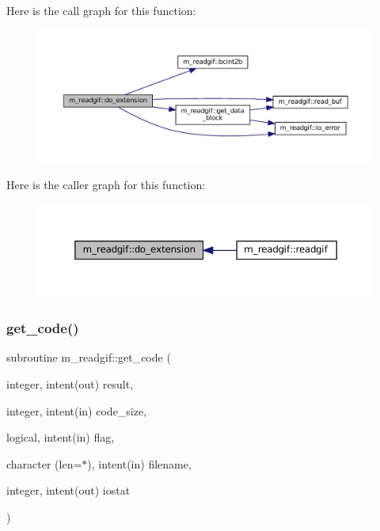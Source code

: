 Here is the call graph for this function\+:
\nopagebreak
\begin{figure}[H]
\begin{center}
\leavevmode
\includegraphics[width=350pt]{namespacem__readgif_a93c5f69ee5054ba2c10ed17b8ab53f6b_cgraph}
\end{center}
\end{figure}
Here is the caller graph for this function\+:
\nopagebreak
\begin{figure}[H]
\begin{center}
\leavevmode
\includegraphics[width=350pt]{namespacem__readgif_a93c5f69ee5054ba2c10ed17b8ab53f6b_icgraph}
\end{center}
\end{figure}
\mbox{\label{namespacem__readgif_a027fedbf7ba68763483988c1aa6d2cea}} 
\subsubsection{\texorpdfstring{get\+\_\+code()}{get\_code()}}
{\footnotesize\ttfamily subroutine m\+\_\+readgif\+::get\+\_\+code (\begin{DoxyParamCaption}\item[{integer, intent(out)}]{result,  }\item[{integer, intent(in)}]{code\+\_\+size,  }\item[{logical, intent(in)}]{flag,  }\item[{character (len=$\ast$), intent(in)}]{filename,  }\item[{integer, intent(out)}]{iostat }\end{DoxyParamCaption})\hspace{0.3cm}{\ttfamily [private]}}




